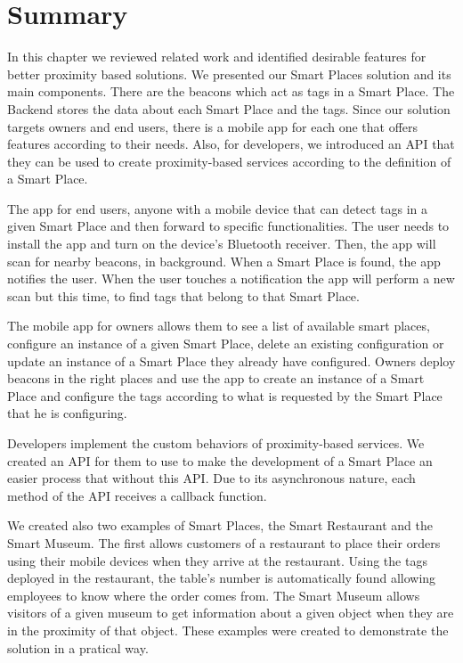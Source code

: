 \section{Summary}
\label{sec:solution_summary}
In this chapter we reviewed related work and identified desirable features for better proximity based solutions.
We presented our Smart Places solution and its main components.
There are the beacons which act as tags in a Smart Place.
The Backend stores the data about each Smart Place and the tags.
Since our solution targets owners and end users, there is a mobile app for each one that offers features according to their needs.
Also, for developers, we introduced an \gls{API} that they can be used to create proximity-based services according to the definition of a Smart Place.

The app for end users, anyone with a mobile device that can detect tags in a given Smart Place and then forward to specific functionalities.
The user needs to install the app and turn on the device's Bluetooth receiver.
Then, the app will scan for nearby beacons, in background.
When a Smart Place is found, the app notifies the user.
When the user touches a notification the app will perform a new scan but this time, to find tags that belong to that Smart Place.

The mobile app for owners allows them to see a list of available smart places, configure an instance of a given Smart Place, delete an existing configuration or update an instance of a Smart Place they already have configured.
Owners deploy beacons in the right places and use the app to create an instance of a Smart Place and configure the tags according to what is requested by the Smart Place that he is configuring.

Developers implement the custom behaviors of proximity-based services.
We created an \gls{API} for them to use to make the development of a Smart Place an easier process that without this \gls{API}.
Due to its asynchronous nature, each method of the \gls{API} receives a callback function.

We created also two examples of Smart Places, the Smart Restaurant and the Smart Museum.
The first allows customers of a restaurant to place their orders using their mobile devices when they arrive at the restaurant. Using the tags deployed in the restaurant, the table's number is automatically found allowing employees to know where the order comes from.
The Smart Museum allows visitors of a given museum to get information about a given object when they are in the proximity of that object.
These examples were created to demonstrate the solution in a pratical way.
